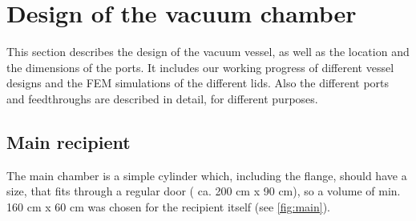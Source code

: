 \chapter{Design of the vacuum chamber}

This section describes the design of the vacuum vessel, as well as the location and the dimensions of the ports.
It includes our working progress of different vessel designs and the FEM simulations of the different lids.
Also the different ports and feedthroughs are described in detail, for different purposes.

\section{Main recipient}
\label{sec:main_recipient}

The main chamber is a simple cylinder which, including the flange, should have a size, that fits through a regular door ( ca. 200 cm x 90 cm), so a volume of min. 160 cm x 60 cm was chosen for the recipient itself (see \autoref{fig:main}).

